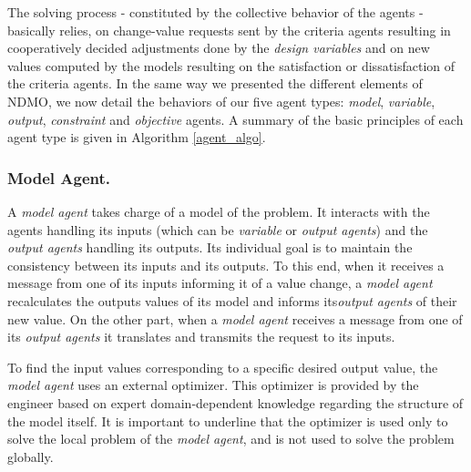 The solving process - constituted by the collective behavior of the agents - basically relies, on change-value requests sent by the criteria agents resulting in cooperatively decided adjustments done by the \emph{design variables} and on new values computed by the models resulting on the satisfaction or dissatisfaction of the criteria agents. 
In the same way we presented the different elements of NDMO, we now detail the behaviors of our five agent types: \emph{model}, \emph{variable}, \emph{output}, \emph{constraint} and \emph{objective} agents.
A summary of the basic principles of each agent type is given in Algorithm \ref{agent_algo}.

\subsubsection*{Model Agent.}

A \emph{model agent} takes charge of a model of the problem. It interacts with the agents handling its inputs (which can be \emph{variable} or \emph{output agents}) and the \emph{output agents} handling its outputs. Its individual goal is to maintain the consistency between its inputs and its outputs. To this end, when it receives a message from one of its inputs informing it of a value change, a \emph{model agent} recalculates the outputs values of its model and informs its\emph{output agents} of their new value. On the other part, when a \emph{model agent} receives a message from one of its \emph{output agents} it translates and transmits the request to its inputs. 

To find the input values corresponding to a specific desired output value, the \emph{model agent} uses an external optimizer. This optimizer is provided by the engineer based on expert domain-dependent knowledge regarding the structure of the model itself.
It is important to underline that the optimizer is used only to solve the local problem of the \emph{model agent}, and is  not used to solve the problem globally.



